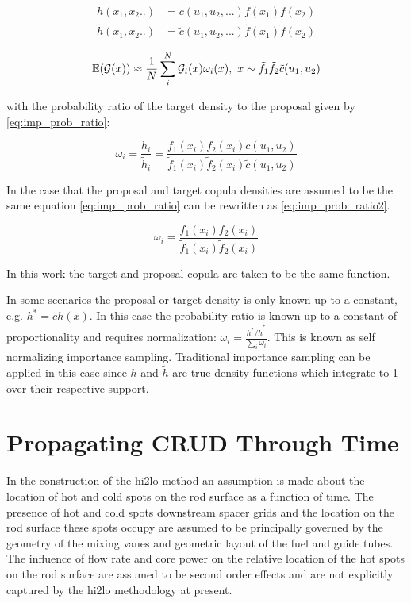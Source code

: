 \begin{align}
    h(x_1, x_2..) &= c(u_1, u_2, ...) f(x_1) f(x_2) \nonumber \\
    \tilde h(x_1, x_2..) &= \tilde c(u_1, u_2, ...) \tilde f(x_1) \tilde f(x_2)
\label{eq:mc_imp_int_2}
\end{align}

\begin{equation}
\operatorname*{\mathbb{E}}(\mathcal G(x)) \approx \frac{1}{N} \sum_i^N \mathcal G_i(x) \omega_i(x), \ x \sim \tilde{f_1} \tilde f_2 \tilde c(u_1, u_2)
\label{eq:mc_imp_int2}
\end{equation}

with the probability ratio of the target density to the proposal given by \ref{eq:imp_prob_ratio}:

\begin{equation}
\omega_i = \frac{h_i}{\tilde h_i} = \frac{f_1(x_i) f_2(x_i)c(u_1, u_2)}{\tilde f_1(x_i) \tilde f_2(x_i) \tilde c(u_1, u_2)}
\label{eq:imp_prob_ratio}
\end{equation}

In the case that the proposal and target copula densities are assumed to be the same equation \ref{eq:imp_prob_ratio} can be rewritten as \ref{eq:imp_prob_ratio2}.

\begin{equation}
\omega_i = \frac{f_1(x_i) f_2(x_i)}{\tilde f_1(x_i) \tilde f_2(x_i)}
\label{eq:imp_prob_ratio2}
\end{equation}

In this work the target and proposal copula are taken to be the same function.

In some scenarios the proposal or target density is only known up to a constant, e.g. $h^* = c h(x)$.  In this case the probability ratio is known up to a constant of proportionality and requires normalization: $\omega_i = \frac{h^*/\tilde h^*}{\sum_i \omega_i}$.  This is known as self normalizing importance sampling.  Traditional importance sampling can be applied in this case since $h$ and $\tilde{h}$ are true density functions which integrate to 1 over their respective support.

\section{Propagating CRUD Through Time}

In the construction of the hi2lo method an assumption is made about the location of hot and cold spots on the rod surface as a function of time.   The presence of hot and cold spots downstream spacer grids and the location on the rod surface these spots occupy are assumed to be principally governed by the geometry of the mixing vanes and geometric layout of the fuel and guide tubes.  The influence of flow rate and core power on the relative location of the hot spots on the rod surface are assumed to be second order effects and are not explicitly captured by the hi2lo methodology at present.

